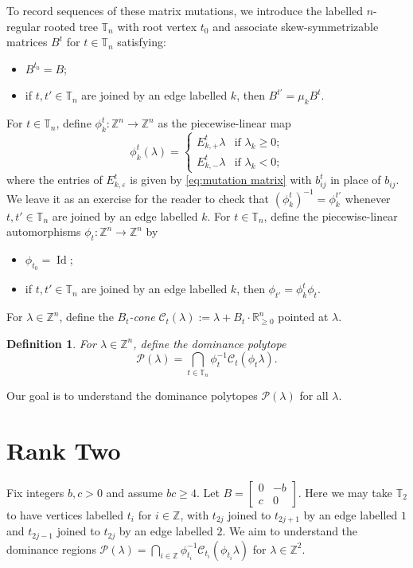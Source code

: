 \documentclass{amsart}
\newtheorem{definition}[theorem]{Definition}
\numberwithin{theorem}{section}
\newcommand{\cC}{\mathcal{C}}
\newcommand{\cP}{\mathcal{P}}
\newcommand{\RR}{\mathbb{R}}
\newcommand{\TT}{\mathbb{T}}
\newcommand{\ZZ}{\mathbb{Z}}
\newcommand{\Id}{\operatorname{Id}}
\begin{document}
  To record sequences of these matrix mutations, we introduce the labelled $n$-regular rooted tree $\TT_n$ with root vertex $t_0$ and associate skew-symmetrizable matrices $B^t$ for $t\in\TT_n$ satisfying:
  \begin{itemize}
    \item $B^{t_0}=B$;
    \item if $t,t'\in\TT_n$ are joined by an edge labelled $k$, then $B^{t'}=\mu_k B^t$.
  \end{itemize}

  For $t\in\TT_n$, define $\phi^t_k:\ZZ^n\to\ZZ^n$ as the piecewise-linear map
  \[\phi^t_k(\lambda)=\begin{cases} E^t_{k,+}\lambda & \text{if $\lambda_k\ge0$;}\\ E^t_{k,-}\lambda & \text{if $\lambda_k<0$;} \end{cases}\]
  where the entries of $E^t_{k,\varepsilon}$ is given by \eqref{eq:mutation matrix} with $b^t_{ij}$ in place of $b_{ij}$.
  We leave it as an exercise for the reader to check that $(\phi^t_k)^{-1}=\phi^{t'}_k$ whenever $t,t'\in\TT_n$ are joined by an edge labelled $k$.
  For $t\in\TT_n$, define the piecewise-linear automorphisms $\phi_t:\ZZ^n\to\ZZ^n$ by
  \begin{itemize}
    \item $\phi_{t_0}=\Id$;
    \item if $t,t'\in\TT_n$ are joined by an edge labelled $k$, then $\phi_{t'}=\phi^t_k \phi_t$.
  \end{itemize}
  For $\lambda\in\ZZ^n$, define the \emph{$B_t$-cone} $\cC_t(\lambda):=\lambda+B_t\cdot\RR_{\ge0}^n$ pointed at $\lambda$.
  \begin{definition}
    For $\lambda\in\ZZ^n$, define the \emph{dominance polytope} 
    \[ \cP(\lambda) = \bigcap_{t\in\TT_n} \phi_t^{-1} \cC_t(\phi_t \lambda). \]
  \end{definition}
  Our goal is to understand the dominance polytopes $\cP(\lambda)$ for all $\lambda$.

  \section{Rank Two}
  Fix integers $b,c>0$ and assume $bc\ge 4$.
  Let $B=\left[ \begin{array}{cc} 0 & -b \\ c & 0 \end{array} \right]$.
  Here we may take $\TT_2$ to have vertices labelled $t_i$ for $i\in\ZZ$, with $t_{2j}$ joined to $t_{2j+1}$ by an edge labelled $1$ and $t_{2j-1}$ joined to $t_{2j}$ by an edge labelled $2$.
  We aim to understand the dominance regions $\cP(\lambda) = \bigcap_{i\in\ZZ} \phi_{t_i}^{-1} \cC_{t_i}(\phi_{t_i} \lambda)$ for $\lambda\in\ZZ^2$.
\end{document}
